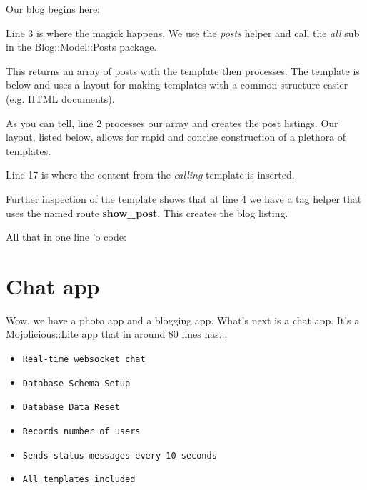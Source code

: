 \documentclass[14pt]{extreport}
\newcommand\Small{\fontsize{12}{13.0}\fontencoding{T1}\selectfont}
\newcommand*\LSTfont{\Small\ttfamily\SetTracking{encoding=*}{-60}\lsstyle}
\begin{document}
Our blog begins here:



Line 3 is where the magick happens. We use the \textit{posts} helper and call
the \textit{all} sub in the Blog::Model::Posts package.  



This returns an array of posts with the template then processes.  The template
is below and uses a layout for making templates with a common structure easier
(e.g. HTML documents).



As you can tell, line 2 processes our array and creates the post listings.  Our
layout, listed below, allows for rapid and concise construction of a plethora
of templates.



Line 17 is where the content from the \textit{calling} template is inserted.

Further inspection of the template shows that at line 4 we have a tag helper that
uses the named route \textbf{show\_post}.  This creates the blog listing.

All that in one line 'o code:



\section{Chat app}

Wow, we have a photo app and a blogging app.  What's next is a chat app.  It's
a Mojolicious::Lite app that in around 80 lines has...

\begin{itemize} \itemsep1pt \parskip0pt 
\item \verb|Real-time websocket chat|
\item \verb|Database Schema Setup|
\item \verb|Database Data Reset|
\item \verb|Records number of users|
\item \verb|Sends status messages every 10 seconds|
\item \verb|All templates included|
\end{itemize}
\end{document}
